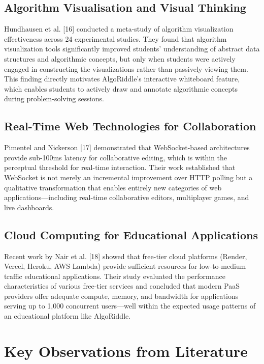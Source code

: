\subsection{Algorithm Visualisation and Visual Thinking}

Hundhausen et al. [16] conducted a meta-study of algorithm visualization effectiveness across 24 experimental studies. They found that algorithm visualization tools significantly improved students' understanding of abstract data structures and algorithmic concepts, but only when students were actively engaged in constructing the visualizations rather than passively viewing them. This finding directly motivates AlgoRiddle's interactive whiteboard feature, which enables students to actively draw and annotate algorithmic concepts during problem-solving sessions.

\subsection{Real-Time Web Technologies for Collaboration}

Pimentel and Nickerson [17] demonstrated that WebSocket-based architectures provide sub-100ms latency for collaborative editing, which is within the perceptual threshold for real-time interaction. Their work established that WebSocket is not merely an incremental improvement over HTTP polling but a qualitative transformation that enables entirely new categories of web applications---including real-time collaborative editors, multiplayer games, and live dashboards.

\subsection{Cloud Computing for Educational Applications}

Recent work by Nair et al. [18] showed that free-tier cloud platforms (Render, Vercel, Heroku, AWS Lambda) provide sufficient resources for low-to-medium traffic educational applications. Their study evaluated the performance characteristics of various free-tier services and concluded that modern PaaS providers offer adequate compute, memory, and bandwidth for applications serving up to 1,000 concurrent users---well within the expected usage patterns of an educational platform like AlgoRiddle.

\section{Key Observations from Literature}

